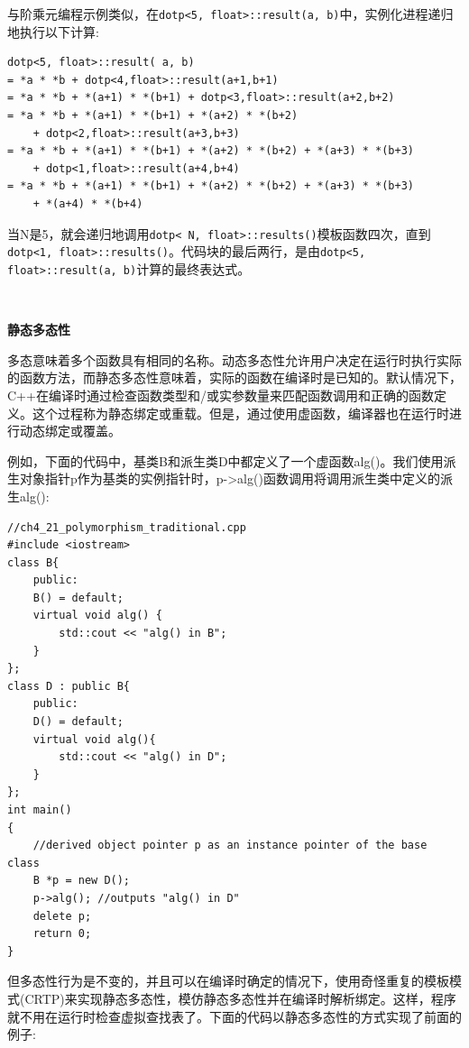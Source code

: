 与阶乘元编程示例类似，在\texttt{dotp<5, float>::result(a, b)}中，实例化进程递归地执行以下计算: \par

\begin{lstlisting}[caption={}]
dotp<5, float>::result( a, b)
= *a * *b + dotp<4,float>::result(a+1,b+1)
= *a * *b + *(a+1) * *(b+1) + dotp<3,float>::result(a+2,b+2)
= *a * *b + *(a+1) * *(b+1) + *(a+2) * *(b+2)
	+ dotp<2,float>::result(a+3,b+3)
= *a * *b + *(a+1) * *(b+1) + *(a+2) * *(b+2) + *(a+3) * *(b+3)
	+ dotp<1,float>::result(a+4,b+4)
= *a * *b + *(a+1) * *(b+1) + *(a+2) * *(b+2) + *(a+3) * *(b+3)
	+ *(a+4) * *(b+4)
\end{lstlisting}

当N是5，就会递归地调用\texttt{dotp< N, float>::results()}模板函数四次，直到\texttt{dotp<1, float>::results()}。代码块的最后两行，是由\texttt{dotp<5, float>::result(a, b)}计算的最终表达式。 \par

\noindent\textbf{}\ \par
\textbf{静态多态性} \ \par
多态意味着多个函数具有相同的名称。动态多态性允许用户决定在运行时执行实际的函数方法，而静态多态性意味着，实际的函数在编译时是已知的。默认情况下，C++在编译时通过检查函数类型和/或实参数量来匹配函数调用和正确的函数定义。这个过程称为静态绑定或重载。但是，通过使用虚函数，编译器也在运行时进行动态绑定或覆盖。 \par
例如，下面的代码中，基类B和派生类D中都定义了一个虚函数alg()。我们使用派生对象指针p作为基类的实例指针时，p->alg()函数调用将调用派生类中定义的派生alg(): \par

\begin{lstlisting}[caption={}]
//ch4_21_polymorphism_traditional.cpp
#include <iostream>
class B{
	public:
	B() = default;
	virtual void alg() {
		std::cout << "alg() in B";
	}
};
class D : public B{
	public:
	D() = default;
	virtual void alg(){
		std::cout << "alg() in D";
	}
};
int main()
{
	//derived object pointer p as an instance pointer of the base class
	B *p = new D();
	p->alg(); //outputs "alg() in D"
	delete p;
	return 0;
}
\end{lstlisting}

但多态性行为是不变的，并且可以在编译时确定的情况下，使用奇怪重复的模板模式(CRTP)来实现静态多态性，模仿静态多态性并在编译时解析绑定。这样，程序就不用在运行时检查虚拟查找表了。下面的代码以静态多态性的方式实现了前面的例子: \par

